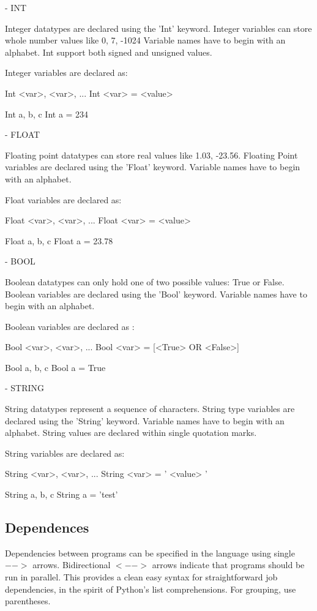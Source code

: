 - INT

Integer datatypes are declared using the 'Int' keyword. Integer variables can store whole number values like 0, 7, -1024
Variable names have to begin with an alphabet. Int support both signed and unsigned values.

Integer variables are declared as:

Int <var>, <var>, ...
Int <var> = <value>

Int a, b, c
Int a = 234


- FLOAT

Floating point datatypes can store real values like 1.03, -23.56. Floating Point variables are declared using the 'Float' keyword. Variable names have to begin with an alphabet.

Float variables are declared as:

Float <var>, <var>, ...
Float <var> = <value>

Float a, b, c
Float a = 23.78


- BOOL

Boolean datatypes can only hold one of two possible values: True or False. Boolean variables are declared using the 'Bool' keyword. Variable names have to begin with an alphabet.

Boolean variables are declared as :

Bool <var>, <var>, ...
Bool <var> = [<True> OR <False>]

Bool a, b, c
Bool a = True



- STRING

String datatypes represent a sequence of characters. String type variables are declared using the 'String' keyword. Variable names have to begin with an alphabet. String values are declared within single quotation marks.

String variables are declared as:

String <var>, <var>, ...
String <var> = ' <value> '

String a, b, c
String a = 'test'


\subsection{Dependences}
Dependencies between programs can be specified in the language using single $-->$ arrows. Bidirectional $<-->$ arrows indicate that programs should be run in parallel. This provides a clean easy syntax for straightforward job dependencies, in the spirit of Python's list comprehensions. For grouping, use parentheses.

